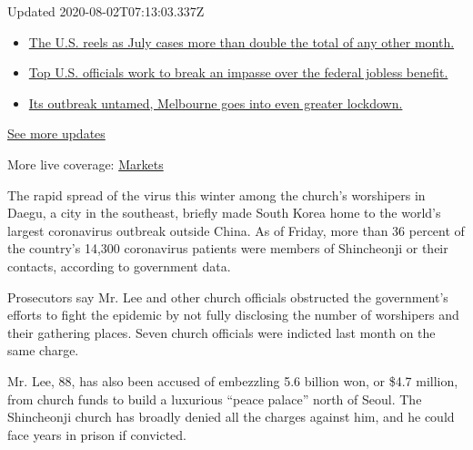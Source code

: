 Updated 2020-08-02T07:13:03.337Z

\begin{itemize}
\tightlist
\item
  \href{https://www.nytimes.com/2020/08/01/world/coronavirus-covid-19.html?action=click\&pgtype=Article\&state=default\&region=MAIN_CONTENT_1\&context=storylines_live_updates\#link-34047410}{The
  U.S. reels as July cases more than double the total of any other
  month.}
\item
  \href{https://www.nytimes.com/2020/08/01/world/coronavirus-covid-19.html?action=click\&pgtype=Article\&state=default\&region=MAIN_CONTENT_1\&context=storylines_live_updates\#link-780ec966}{Top
  U.S. officials work to break an impasse over the federal jobless
  benefit.}
\item
  \href{https://www.nytimes.com/2020/08/01/world/coronavirus-covid-19.html?action=click\&pgtype=Article\&state=default\&region=MAIN_CONTENT_1\&context=storylines_live_updates\#link-2bc8948}{Its
  outbreak untamed, Melbourne goes into even greater lockdown.}
\end{itemize}

\href{https://www.nytimes.com/2020/08/01/world/coronavirus-covid-19.html?action=click\&pgtype=Article\&state=default\&region=MAIN_CONTENT_1\&context=storylines_live_updates}{See
more updates}

More live coverage:
\href{https://www.nytimes.com/live/2020/07/31/business/stock-market-today-coronavirus?action=click\&pgtype=Article\&state=default\&region=MAIN_CONTENT_1\&context=storylines_live_updates}{Markets}

The rapid spread of the virus this winter among the church's worshipers
in Daegu, a city in the southeast, briefly made South Korea home to the
world's largest coronavirus outbreak outside China. As of Friday, more
than 36 percent of the country's 14,300 coronavirus patients were
members of Shincheonji or their contacts, according to government data.

Prosecutors say Mr. Lee and other church officials obstructed the
government's efforts to fight the epidemic by not fully disclosing the
number of worshipers and their gathering places. Seven church officials
were indicted last month on the same charge.

Mr. Lee, 88, has also been accused of embezzling 5.6 billion won, or
\$4.7 million, from church funds to build a luxurious ``peace palace''
north of Seoul. The Shincheonji church has broadly denied all the
charges against him, and he could face years in prison if convicted.

